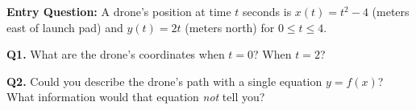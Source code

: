 \documentclass[10pt]{article}
\begin{document}
\vspace{0.08in}

\begin{hookbox}
\textbf{Entry Question:} A drone's position at time $t$ seconds is
$x(t) = t^2 - 4$ (meters east of launch pad) and $y(t) = 2t$ (meters
north) for $0 \le t \le 4$.

\vspace{4pt}
\textbf{Q1.} What are the drone's coordinates when $t = 0$? When $t = 2$?
\writeline

\textbf{Q2.} Could you describe the drone's path with a single equation
$y = f(x)$? What information would that equation \emph{not} tell you?
\end{hookbox}

\vspace{0.08in}
\end{document}
